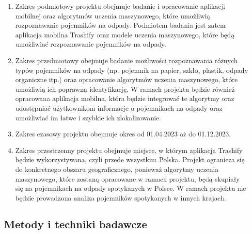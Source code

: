 \documentclass[12pt,twoside]{book}
\begin{document}
\begin{enumerate}[label=--]
    \item Zakres podmiotowy projektu \topic  obejmuje badanie i opracowanie aplikacji mobilnej oraz algorytmów uczenia maszynowego, które umożliwią rozpoznawanie pojemników na odpady. Podmiotem badania jest zatem aplikacja mobilna Trashify oraz modele uczenia maszynowego, które będą umożliwiać rozpoznawanie pojemników na odpady.
    \item Zakres przedmiotowy obejmuje badanie możliwości rozpoznawania różnych typów pojemników na odpady (np. pojemnik na papier, szkło, plastik, odpady organiczne itp.) oraz opracowanie algorytmów uczenia maszynowego, które umożliwią ich poprawną identyfikację. W ramach projektu będzie również opracowana aplikacja mobilna, która będzie integrować te algorytmy oraz udostępniać użytkownikom informacje o pojemnikach na odpady oraz umożliwiać im łatwe i szybkie ich zlokalizowanie.
    \item Zakres czasowy projektu obejmuje okres od 01.04.2023 aż do 01.12.2023.
    \item Zakres przestrzenny projektu obejmuje miejsce, w którym aplikacja Trashify będzie wykorzystywana, czyli przede wszystkim Polska. Projekt ogranicza się do konkretnego obszaru geograficznego, ponieważ algorytmy uczenia maszynowego, które zostaną opracowane w ramach projektu, będą skupiały się na pojemnikach na odpady spotykanych w Polsce. W ramach projektu nie będzie prowadzona analiza pojemników spotykanych w innych krajach.
\end{enumerate}

\subsection{Metody i techniki badawcze}
\end{document}

